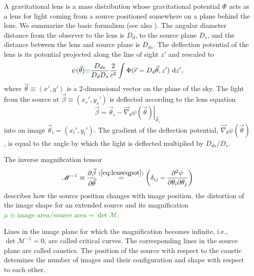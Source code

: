 \documentclass[useAMS,usenatbib]{mnras}
\newcommand{\vect}[1]{\vec{#1}} %
\newcommand{\NEW}[1]{\textcolor{ForestGreen}{#1}}
\newcommand{\OLD}[1]{}
\begin{document}
A gravitational lens is a mass distribution whose gravitational potential $\Phi$ acts as a lens for light coming from a source positioned somewhere on a plane behind the lens. We summarize the basic formalism (see also \citealt{1992grle.book.....S,1996astro.ph..6001N,2006glsw.conf....1S,2006glsw.conf...91K,2010ARA&A..48...87T}). The angular diameter distance from the observer to the lens is $D_d$, to the source plane $D_s$, and the distance between the lens and source plane is $D_{ds}$. The deflection potential of the lens is its potential projected along the line of sight $z'$ and rescaled to
\begin{equation}
\psi(\vect{\theta}) \OLD{:=}\NEW{\equiv} \frac{D_{ds}}{D_d D_s} \frac{2}{c^2} \int \Phi(\vect{r}=D_d \vect{\theta},z') {\ \mathrm d} z', \label{eq:psidef}
\end{equation}
where $\vect{\theta}\equiv(x',y')$ is a 2-dimensional vector on the plane of the sky. The light from the source at $\vect{\beta} \equiv (x_s',y_s')$ is deflected according to the lens equation
\begin{equation}
\vect{\beta} = \vect{\theta}_i - \left.\vect{\nabla}_\theta \psi(\vect{\theta})\right|_{\vect{\theta}_i} \label{eq:lenseqpot}
\end{equation}
into an image $\vect{\theta}_i = (x_i',y_i')$. The gradient of the deflection potential, $\vect{\nabla}_\theta \psi(\vect{\theta})$, is equal to the angle by which the light is deflected multiplied by $D_{ds}/D_{s}$.

\OLD{The total time delay of a deflected light path through $\vect{\theta}$ with respect to the unperturbed light path is given by 
\begin{equation}
\Delta t(\vect{\theta}) = \frac{(1+z_d)}{c} \frac{D_d D_s}{D_{ds}} \left[ \frac 12 (\vect{\theta} - \vect{\beta})^2 - \psi(\vect{\theta})\right]. \label{eq:timedelay}
\end{equation}
 According to Fermat's principle the image positions will be observed at the extrema of $\Delta t(\vect{\theta})$.}

The inverse magnification tensor
\begin{equation}
\mathscr{M}^{-1} \equiv \frac{\partial \vect{\beta}}{\partial \vect{\theta}} \overset{(\ref{eq:lenseqpot})}{=} \left(\delta_{ij} - \frac{\partial^2 \psi}{\partial \theta_i \partial \theta_j} \right)\label{eq:magnificationtensor}
\end{equation}
describes how the source position changes with image position\OLD{. It also describes}\NEW{,} the distortion of the image shape for an extended source and its magnification \OLD{$\mu$ due to lensing according to}\NEW{$\mu \equiv \text{image area}/\text{source area} = \det \mathscr{M}$}.
\OLD{$$\mu \equiv \frac{\text{image area}}{\text{source area}} = \det \mathscr{M}.$$}
Lines in the image plane for which the magnification becomes infinite, i.e., $\det \mathscr{M}^{-1} = 0$, are called critical curves. The corresponding lines in the source plane are called caustics. The position of the source with respect to the caustic detemines the number of images and their configuration and shape with respect to each other.
\end{document}
